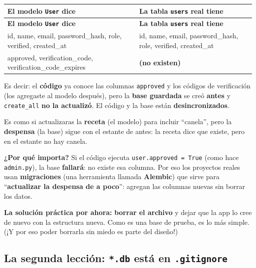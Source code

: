 \documentclass[11pt,a4paper]{article}
\begin{document}
\begin{center}
{\small
\setlength{\tabcolsep}{4pt}
\begin{longtable}{@{}>{\raggedright\arraybackslash}p{7.5cm}>{\raggedright\arraybackslash}p{7.3cm}@{}}
\toprule
\textbf{El modelo \texttt{User} dice} & \textbf{La tabla \texttt{users} real tiene} \\
\midrule
\endfirsthead
\toprule
\textbf{El modelo \texttt{User} dice} & \textbf{La tabla \texttt{users} real tiene} \\
\midrule
\endhead
id, name, email, password\_hash, role, verified, created\_at & id, name, email, password\_hash, role, verified, created\_at \\
approved, verification\_code, verification\_code\_expires & \textbf{(no existen)} \\
\bottomrule
\end{longtable}
}
\end{center}

Es decir: el \textbf{código} ya conoce las columnas \texttt{approved} y los códigos de
verificación (los agregaste al modelo después), pero la \textbf{base guardada} se creó
\textbf{antes} y \texttt{create\_all} \textbf{no la actualizó}. El código y la base están
\textbf{desincronizados}.

\begin{analogia}
Es como si actualizaras la \textbf{receta} (el modelo) para incluir ``canela'', pero la
\textbf{despensa} (la base) sigue con el estante de antes: la receta dice que existe, pero en
el estante no hay canela.
\end{analogia}

\textbf{¿Por qué importa?} Si el código ejecuta \texttt{user.approved = True} (como hace
\texttt{admin.py}), la base \textbf{fallará}: no existe esa columna. Por eso los proyectos
reales usan \textbf{migraciones} (una herramienta llamada \textbf{Alembic}) que sirve para
``\textbf{actualizar la despensa de a poco}'': agregan las columnas nuevas sin borrar los datos.

\textbf{La solución práctica por ahora:} \textbf{borrar el archivo} y dejar que la app lo cree
de nuevo con la estructura nueva. Como es una base de prueba, es lo más simple. (¡Y por eso
poder borrarla sin miedo es parte del diseño!)

\subsection{La segunda lección: \texttt{*.db} está en \texttt{.gitignore}}
\end{document}
